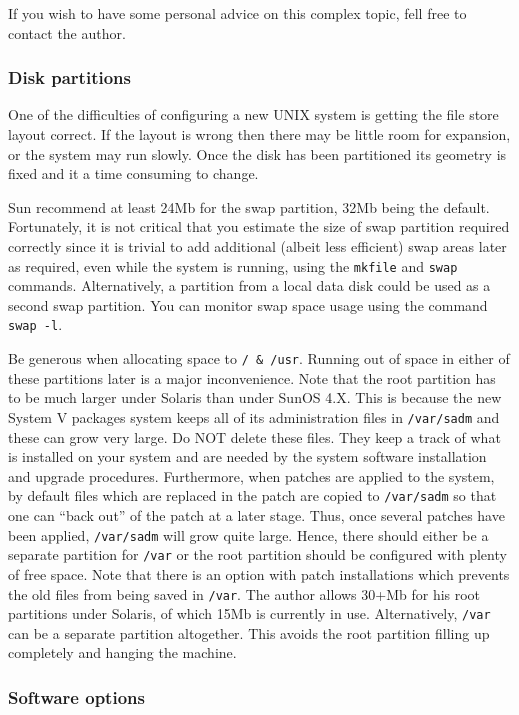 If you wish to have some personal advice on this complex topic, fell free to
contact the author.

\subsubsection{Disk partitions}

One of the difficulties of configuring a new UNIX system is getting the
file store layout correct. If the layout is wrong then there may be little room
for expansion, or the system may run slowly. Once the disk has been partitioned
its geometry is fixed and it a time consuming to change.


Sun recommend at least 24Mb for the swap partition, 32Mb being the default.
Fortunately, it is not critical that you estimate the size of swap partition
required correctly since it is trivial to add additional (albeit less efficient)
swap areas later as required, even while the system is running, using the
\verb+mkfile+ and \verb+swap+ commands. Alternatively, a partition
from a local data disk could be used as a second swap partition.
You can monitor swap space usage using the command \verb+swap -l+.

Be generous when allocating space to {\tt / \& /usr}. Running out of
space in either of these partitions later is a major inconvenience.
Note that the root partition has to be much larger under Solaris than
under SunOS 4.X.  This is because the new System V packages system
keeps all of its administration files in {\tt /var/sadm} and these can
grow very large.  Do NOT delete these files. They keep a track of what
is installed on your system and are needed by the system software
installation and upgrade procedures. Furthermore, when patches are applied
to the system, by default files which are replaced in the patch are copied
to {\tt /var/sadm} so that one can ``back out'' of the patch at a later
stage. Thus, once several patches have been applied, {\tt /var/sadm}
will grow quite large. Hence, there should either be a separate partition
for {\tt /var} or the root partition should be configured with plenty
of free space. Note that there is an option with patch installations which
prevents the old files from being saved in {\tt /var}.
The author allows 30+Mb for his
root partitions under Solaris, of which 15Mb is currently in use.
Alternatively, {\tt /var} can be a separate partition altogether. This
avoids the root partition filling up completely and hanging the machine.

\subsubsection{Software options}

